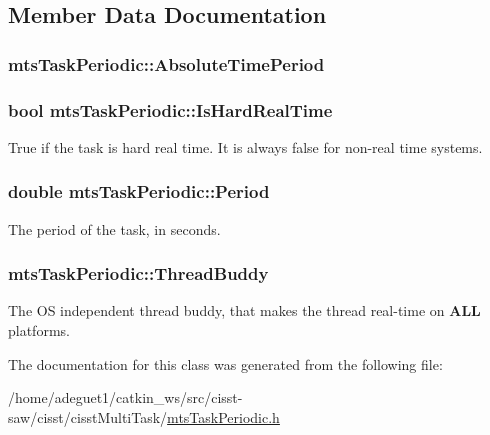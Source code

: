 \subsection{Member Data Documentation}
\hypertarget{classmts_task_periodic_a1e5e04be2039534dd19d645be4e7da60}{
\subsubsection[{Absolute\-Time\-Period}]{ mts\-Task\-Periodic\-::\-Absolute\-Time\-Period\hspace{0.3cm}{\ttfamily [protected]}}}\label{classmts_task_periodic_a1e5e04be2039534dd19d645be4e7da60}
\hypertarget{classmts_task_periodic_a84c05c06ebc6938d0c7ee007ea41a470}{
\subsubsection[{Is\-Hard\-Real\-Time}]{\setlength{\rightskip}{0pt plus 5cm}bool mts\-Task\-Periodic\-::\-Is\-Hard\-Real\-Time\hspace{0.3cm}{\ttfamily [protected]}}}\label{classmts_task_periodic_a84c05c06ebc6938d0c7ee007ea41a470}
True if the task is hard real time. It is always false for non-\/real time systems. \hypertarget{classmts_task_periodic_a8453eaab96a98c048192d7511f263988}{
\subsubsection[{Period}]{\setlength{\rightskip}{0pt plus 5cm}double mts\-Task\-Periodic\-::\-Period\hspace{0.3cm}{\ttfamily [protected]}}}\label{classmts_task_periodic_a8453eaab96a98c048192d7511f263988}
The period of the task, in seconds. \hypertarget{classmts_task_periodic_a8658fffa3b56f91a7853c20bd622c069}{
\subsubsection[{Thread\-Buddy}]{ mts\-Task\-Periodic\-::\-Thread\-Buddy\hspace{0.3cm}{\ttfamily [protected]}}}\label{classmts_task_periodic_a8658fffa3b56f91a7853c20bd622c069}
The O\-S independent thread buddy, that makes the thread real-\/time on {\bfseries A\-L\-L} platforms. 

The documentation for this class was generated from the following file\-:\begin{DoxyCompactItemize}
\item 
/home/adeguet1/catkin\-\_\-ws/src/cisst-\/saw/cisst/cisst\-Multi\-Task/\hyperlink{mts_task_periodic_8h}{mts\-Task\-Periodic.\-h}\end{DoxyCompactItemize}

